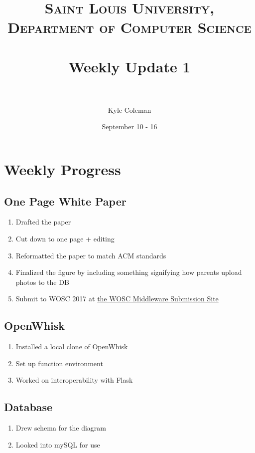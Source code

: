\documentclass[paper=a4, fontsize=12pt]{scrartcl} %
\title{	
\normalfont \normalsize 
\textsc{Saint Louis University, Department of Computer Science} \\ [25pt] %
\horrule{0.5pt} \\[0.4cm] %
\huge Weekly Update 1\\ %
\horrule{2pt} \\[0.5cm] %
}
\author{Kyle Coleman} %
\date{September 10 - 16} %
\numberwithin{equation}{section} %
\numberwithin{figure}{section} %
\numberwithin{table}{section} %
\begin{document}
\maketitle %


\section{Weekly Progress}





\subsection{One Page White Paper}
\begin{enumerate}
	\item Drafted the paper
    \item Cut down to one page + editing
    \item Reformatted the paper to match ACM standards
    \item Finalized the figure by including something 	 signifying how parents upload photos to the DB
    \item Submit to WOSC 2017 at \href{https://middleware17wosc.hotcrp.com}{the WOSC Middleware Submission Site}
\end{enumerate}

\subsection{OpenWhisk}
\begin{enumerate}
	\item Installed a local clone of OpenWhisk
    \item Set up function environment
    \item Worked on interoperability with Flask
\end{enumerate}

\subsection{Database}
\begin{enumerate}
	\item Drew schema for the diagram
    \item Looked into mySQL for use
\end{enumerate}
\end{document}
